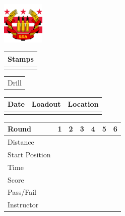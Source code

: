 \documentclass[8pt]{article}
\author{DC Metro Socialist Rifle Association}
\begin{document}
\begin{minipage}[t]{2cm} 
	\includegraphics[width=2cm, height=2cm]{DC.png}
	\begin{tabular}{p{1.5cm}|}
		Stamps \\
		\hline
		\\[5.5cm]
	\end{tabular}
\end{minipage}
\hfill
\begin{minipage}[t]{11cm}
	\begin{minipage}[t]{3cm}
		\begin{tabular}{ p{3cm} }			
			\large Drill\\[1cm]			
		\end{tabular}
	\end{minipage}
	\hfill
	\begin{minipage}[t]{7cm}
		\begin{tabular}{ | p{1.5cm} | p{1.5cm} | p{1.5cm} |}
			\hline
			Date & Loadout & Location\\ 
			\hline
			&  &  \\ 
			\hline
		\end{tabular}
	\end{minipage}
	\begin{tabular}{ | p{1.5cm} | p{1cm} | p{1cm} | p{1cm} | p{1cm} | p{1cm} | p{1cm} |}
		\hline
		Round & 1 & 2 & 3 & 4 & 5 & 6 \\ 
		\hline
		\tiny Distance & & & & & & \\[0.5cm] 		
		\hline
		\tiny Start Position & & & & & & \\[0.5cm] 
		\hline
		\tiny Time & & & & & & \\[0.5cm] 
		\hline
		\tiny Score & & & & & & \\[0.5cm] 
		\hline
		\tiny Pass/Fail & & & & & & \\[0.5cm]
		\hline
		\tiny Instructor & & & & & & \\[0.5cm]
		\hline
	\end{tabular}
\end{minipage}
\end{document}

